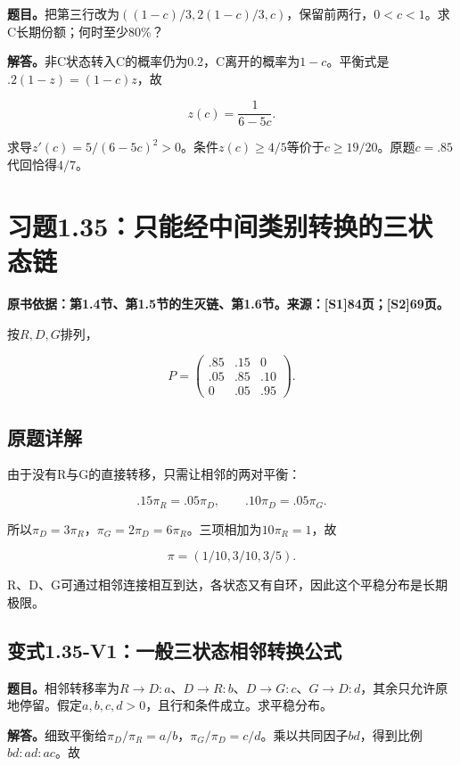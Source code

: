 \documentclass[
  11pt,
  a4paper,
  UTF8,
  fontset=fandol]{ctexart}
\begin{document}
\textbf{题目。}把第三行改为\(((1-c)/3,2(1-c)/3,c)\)，保留前两行，\(0<c<1\)。求C长期份额；何时至少80\%？

\textbf{解答。}非C状态转入C的概率仍为0.2，C离开的概率为\(1-c\)。平衡式是\(.2(1-z)=(1-c)z\)，故

\[
\boxed{z(c)=\frac1{6-5c}.}
\]

求导\(z'(c)=5/(6-5c)^2>0\)。条件\(z(c)\ge4/5\)等价于\(c\ge19/20\)。原题\(c=.85\)代回恰得\(4/7\)。

\section{习题1.35：只能经中间类别转换的三状态链}\label{ux4e60ux98981.35ux53eaux80fdux7ecfux4e2dux95f4ux7c7bux522bux8f6cux6362ux7684ux4e09ux72b6ux6001ux94fe}

\textbf{原书依据：第1.4节、第1.5节的生灭链、第1.6节。来源：{[}S1{]}84页；{[}S2{]}69页。}

按\(R,D,G\)排列，

\[
P=\begin{pmatrix}.85&.15&0\\.05&.85&.10\\0&.05&.95\end{pmatrix}.
\]

\subsection{原题详解}\label{ux539fux9898ux8be6ux89e3-5}

由于没有R与G的直接转移，只需让相邻的两对平衡：

\[
.15\pi_R=.05\pi_D,\qquad
.10\pi_D=.05\pi_G.
\]

所以\(\pi_D=3\pi_R\)，\(\pi_G=2\pi_D=6\pi_R\)。三项相加为\(10\pi_R=1\)，故

\[
\boxed{\pi=(1/10,3/10,3/5).}
\]

R、D、G可通过相邻连接相互到达，各状态又有自环，因此这个平稳分布是长期极限。

\subsection{变式1.35-V1：一般三状态相邻转换公式}\label{ux53d8ux5f0f1.35-v1ux4e00ux822cux4e09ux72b6ux6001ux76f8ux90bbux8f6cux6362ux516cux5f0f}

\textbf{题目。}相邻转移率为\(R\to D:a\)、\(D\to R:b\)、\(D\to G:c\)、\(G\to D:d\)，其余只允许原地停留。假定\(a,b,c,d>0\)，且行和条件成立。求平稳分布。

\textbf{解答。}细致平衡给\(\pi_D/\pi_R=a/b\)，\(\pi_G/\pi_D=c/d\)。乘以共同因子\(bd\)，得到比例\(bd:ad:ac\)。故
\end{document}
